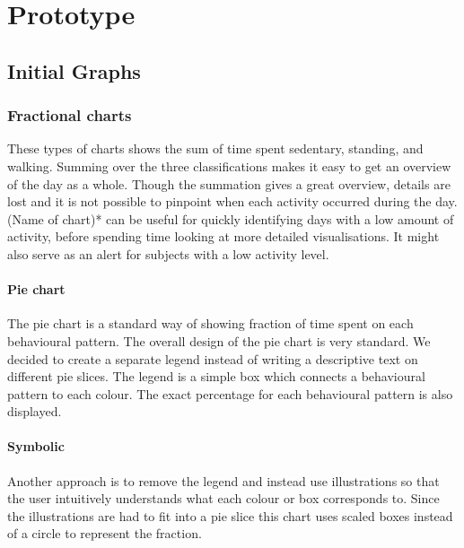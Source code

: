 \chapter{Prototype} %

\label{Chapter5} %


\section{Initial Graphs}

\subsection{Fractional charts}
These types of charts shows the sum of time spent sedentary, standing, and walking. Summing over the three classifications makes it easy to get an overview of the day as a whole. Though the summation gives a great overview, details are lost and it is not possible to pinpoint when each activity occurred during the day. (Name of chart)* can be useful for quickly identifying days with a low amount of activity, before spending time looking at more detailed visualisations. It might also serve as an alert for subjects with a low activity level.

\subsubsection{Pie chart}
The pie chart is a standard way of showing fraction of time spent on each behavioural pattern. The overall design of the pie chart is very standard. We decided to create a separate legend instead of writing a descriptive text on different pie slices. The legend is a simple box which connects a behavioural pattern to each colour. The exact percentage for each behavioural pattern is also displayed.

\subsubsection{Symbolic}
Another approach is to remove the legend and instead use illustrations so that the user intuitively understands what each colour or box corresponds to. Since the illustrations are had to fit into a pie slice this chart uses scaled boxes instead of a circle to represent the fraction. 


